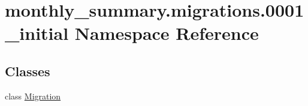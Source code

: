 \hypertarget{namespacemonthly__summary_1_1migrations_1_10001__initial}{\section{monthly\-\_\-summary.\-migrations.0001\-\_\-initial Namespace Reference}
\label{namespacemonthly__summary_1_1migrations_1_10001__initial}
}
\subsection*{Classes}
\begin{DoxyCompactItemize}
\item 
class \hyperlink{classmonthly__summary_1_1migrations_1_10001__initial_1_1Migration}{Migration}
\end{DoxyCompactItemize}
